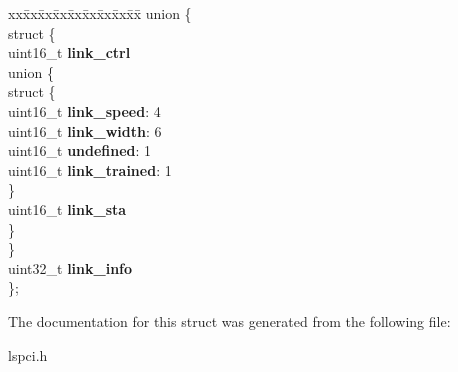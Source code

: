\begin{DoxyCompactItemize}
\begin{tabbing}
\end{tabbing}\item 
\mbox{\label{structpci_a004891641c045f642104bf72a9aed16a}} 
\begin{tabbing}
xx\=xx\=xx\=xx\=xx\=xx\=xx\=xx\=xx\=\kill
union \{\\
\mbox{\label{unionpci_1_1_0D17_a650dbdb02e5a5e15cdd1338fa140ad76}} 
\>struct \{\\
\>\>uint16\_t {\bfseries link\_ctrl}\\
\mbox{\label{structpci_1_1_0D17_1_1_0D23_a72bd661dd07209faf38c4ddead0065ce}} 
\>\>union \{\\
\mbox{\label{unionpci_1_1_0D17_1_1_0D23_1_1_0D25_a46a146c7f80f9de4dd05d1ddc5af6891}} 
\>\>\>struct \{\\
\>\>\>\>uint16\_t {\bfseries link\_speed}: 4\\
\>\>\>\>uint16\_t {\bfseries link\_width}: 6\\
\>\>\>\>uint16\_t {\bfseries undefined}: 1\\
\>\>\>\>uint16\_t {\bfseries link\_trained}: 1\\
\>\>\>\} \\
\>\>\>uint16\_t {\bfseries link\_sta}\\
\>\>\} \\
\>\} \\
\>uint32\_t {\bfseries link\_info}\\
\}; \\

\end{tabbing}\end{DoxyCompactItemize}


The documentation for this struct was generated from the following file\+:\begin{DoxyCompactItemize}
\item 
lspci.\+h\end{DoxyCompactItemize}
